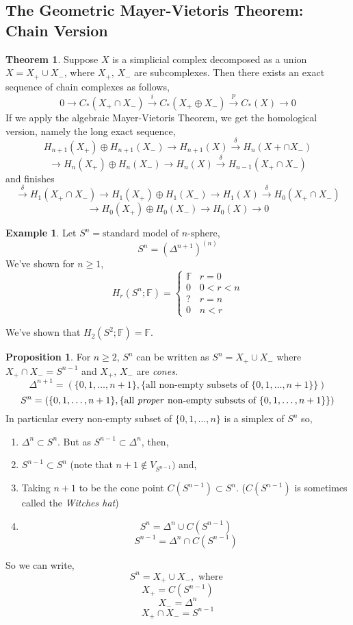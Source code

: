 \documentclass[a4paper,14pt]{extarticle}
\theoremstyle{definition}
\newtheorem*{theorem}{Theorem}
\newtheorem*{proposition}{Proposition}
\newtheorem*{eg}{Example}
\begin{document}
\subsection{The Geometric Mayer-Vietoris Theorem: Chain Version}
\begin{theorem}
Suppose $X$ is a simplicial complex decomposed as a union $X=X_+\cup X_-$,
where $X_+, \,X_-$ are subcomplexes. Then there exists an exact sequence
of chain complexes as follows,
\[0\rightarrow C_*(X_+\cap X_-)\xrightarrow{i} C_*(X_+\oplus X_-)
\xrightarrow{p} C_*(X)\rightarrow 0\]
If we apply the algebraic Mayer-Vietoris Theorem, we get the homological version,
namely the long exact sequence,
\[H_{n+1}(X_+)\oplus H_{n+1}(X_-)\rightarrow H_{n+1}(X)\xrightarrow{\delta}
H_n(X+\cap X_-)\] \[\rightarrow H_n(X_+)\oplus H_n(X_-)\rightarrow H_n(X)
\xrightarrow{\delta} H_{n-1}(X_+\cap X_-)\]
and finishes
\[\xrightarrow{\delta} H_1(X_+\cap X_-)\rightarrow H_1(X_+)\oplus H_1(X_-)
\rightarrow H_1(X)\xrightarrow{\delta} H_0(X_+\cap X_-)\] 
\[\rightarrow H_0(X_+)\oplus H_0(X_-)\rightarrow H_0(X)\rightarrow 0 \]
\end{theorem}
\begin{eg}
Let $S^n=\text{standard model of $n$-sphere}$,
\[S^n=(\Delta^{n+1})^{(n)}\] We've shown for $n\geq1$,
\[H_r(S^n;\mathbb{F})=\begin{cases}
	\mathbb{F} & r=0 \\ 0 & 0<r<n \\ ? & r=n \\ 0 & n < r
\end{cases}\]
\end{eg}

We've shown that $H_2(S^2;\mathbb{F})=\mathbb{F}$.

\begin{proposition}
	For $n\geq 2$, $S^n$ can be written as $S^n=X_+\cup X_-$ where
	$X_+\cap X_-=S^{n-1}$ and $X_+, \,X_-$ are \emph{cones}.
	\[\Delta^{n+1}=(\{0,1,\ldots,n+1\},\{\text{all non-empty subsets of
	$\{0,1,\ldots,n+1\}$}\})\]
	\[S^n=(\{0,1,\ldots,n+1\},\{\text{all \emph{proper} non-empty subsets of
	$\{0,1,\ldots,n+1\}$}\})\]
	In particular every non-empty subset of $\{0,1,\ldots,n\}$ is a simplex
	of $S^n$ so,
	\begin{enumerate}
		\item $\Delta^n\subset S^n$. But as $S^{n-1}\subset \Delta^n$, then,
		\item $S^{n-1}\subset S^n$ (note that $n+1\not\in V_{S^{n-1}})$ and,
		\item Taking $n+1$ to be the cone point $C(S^{n-1})\subset S^n$. 
				($C(S^{n-1})$ is sometimes called the \emph{Witches hat})
		\item
		\[S^n=\Delta^n\cup C(S^{n-1})\] \[S^{n-1}=\Delta^n\cap C(S^{n-1})\]
	\end{enumerate}

		So we can write,
		\[S^n=X_+\cup X_-,\text{ where }\]
		\[X_+=C(S^{n-1})\]
		\[X_-=\Delta^n\]
		\[X_+\cap X_- = S^{n-1}\]
\end{proposition}
\end{document}
